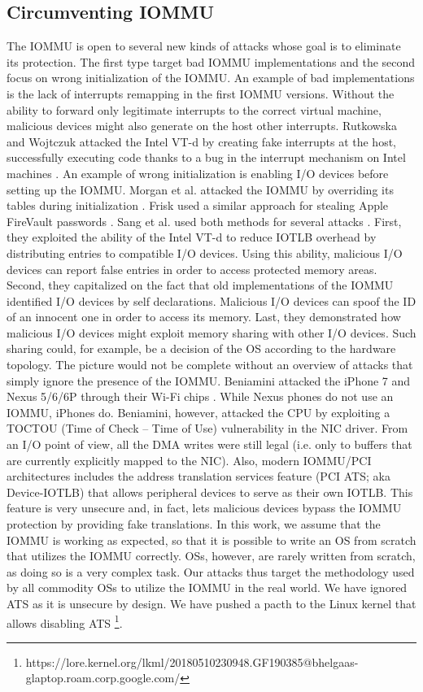 \subsection{Circumventing IOMMU}
The IOMMU is open to several new kinds of attacks whose goal is to eliminate its protection. The first type target bad IOMMU implementations and the second focus on wrong initialization of the IOMMU. An example of bad implementations is the lack of interrupts remapping in the first IOMMU versions. Without the ability to forward only legitimate interrupts to the correct virtual machine, malicious devices might also generate on the host other interrupts. Rutkowska and Wojtczuk attacked the Intel VT-d by creating fake interrupts at the host, successfully executing code thanks to a bug in the interrupt mechanism on Intel machines \cite{WR11}. An example of wrong initialization is enabling I/O devices before setting up the IOMMU. Morgan et al. attacked the IOMMU by overriding its tables during initialization \cite{MANK16}. Frisk used a similar approach for stealing Apple FireVault passwords \cite{Cim16}. Sang et al. used both methods for several attacks \cite{SLND10}. First, they exploited the ability of the Intel VT-d to reduce IOTLB overhead by distributing entries to compatible I/O devices. Using this ability, malicious I/O devices can report false entries in order to access protected memory areas. Second, they capitalized on the fact that old implementations of the IOMMU identified I/O devices by self declarations. Malicious I/O devices can spoof the ID of an innocent one in order to access its memory. Last, they demonstrated how malicious I/O devices might exploit memory sharing with other I/O devices. Such sharing could, for example, be a decision of the OS according to the hardware topology. The picture would not be complete without an overview of attacks that simply ignore the presence of the IOMMU. Beniamini attacked the iPhone 7 and Nexus 5/6/6P through their Wi-Fi chips \cite{Ben17a, Ben17b}. While Nexus phones do not use an IOMMU, iPhones do. Beniamini, however, attacked the CPU by exploiting a TOCTOU (Time of Check – Time of Use) vulnerability in the NIC driver. From an I/O point of view, all the DMA writes were still legal (i.e. only to buffers that are currently explicitly mapped to the NIC). Also, modern IOMMU/PCI architectures includes the address translation services feature (PCI ATS; aka Device-IOTLB) that allows peripheral devices to serve as their own IOTLB. This feature is very unsecure and, in fact, lets malicious devices bypass the IOMMU protection by providing fake translations. In this work, we assume that the IOMMU is working as expected, so that it is possible to write an OS from scratch that utilizes the IOMMU correctly. OSs, however, are rarely written from scratch, as doing so is a very complex task. Our attacks thus target the methodology used by all commodity OSs to utilize the IOMMU in the real world. We have ignored ATS as it is unsecure by design. We have pushed a pacth to the Linux kernel that allows disabling ATS \footnote{https://lore.kernel.org/lkml/20180510230948.GF190385@bhelgaas-glaptop.roam.corp.google.com/}.